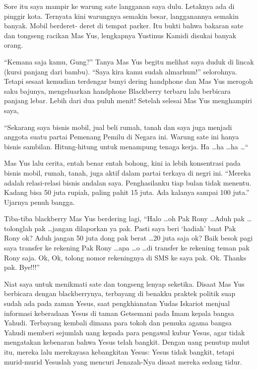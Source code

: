 
\small
	Sore itu saya mampir ke warung sate langganan saya dulu. Letaknya ada di pinggir kota. Ternyata kini warungnya semakin besar, langganannya semakin banyak. Mobil berderet- deret di tempat parker. Itu bukti bahwa bakaran sate dan tongseng racikan Mas Yus, lengkapnya Yustinus Kamidi disukai banyak orang.
	
	``Kemana saja kamu, Gung?'' Tanya Mas Yus begitu melihat saya duduk di lincak (kursi panjang dari bambu). ``Saya kira kamu sudah almarhum!'' selorohnya. Tetapi sesaat kemudian terdengar bunyi dering handphone dan Mas Yus  merogoh saku bajunya, mengeluarkan handphone Blackberry terbaru lalu berbicara panjang lebar. Lebih dari dua puluh menit! Setelah selesai Mas Yus menghampiri saya, 
	
	``Sekarang saya bisnis mobil, jual beli rumah, tanah dan saya juga menjadi anggota suatu partai Pemenang Pemilu di Negara ini. Warung sate ini hanya bisnis sambilan. Hitung-hitung untuk menampung tenaga kerja. Ha \ldots ha \ldots ha \ldots  ``

	Mas Yus lalu cerita, entah benar entah bohong, kini ia lebih konsentrasi pada bisnis mobil, rumah, tanah, juga aktif dalam partai terkaya di negri ini. ``Mereka adalah relasi-relasi bisnis andalan saya. Penghasilanku tiap bulan tidak menentu. Kadang bisa 50 juta rupiah, paling pahit 15 juta. Ada kalanya sampai 100 juta.'' Ujarnya penuh bangga.   
	
	Tiba-tiba blackberry Mas Yus berdering lagi, ``Halo \ldots  oh Pak Rony \ldots  Aduh pak \ldots  tolonglah pak \ldots  jangan dilaporkan ya pak. Pasti saya beri `hadiah' buat Pak Rony ok?  Aduh jangan 50 juta dong pak berat \ldots  20 juta saja ok? Baik besok pagi saya transfer ke rekening Pak Rony \ldots  apa \ldots  o \ldots  di transfer ke rekening teman pak Rony saja. Ok, Ok, tolong nomor rekeningnya di SMS ke saya pak. Ok. Thanks pak. Bye!!!''

	Niat saya untuk menikmati sate dan tongseng lenyap seketika. Disaat Mas Yus berbicara dengan blackberrynya, terbayang di benakku praktek politik suap sudah ada pada zaman Yesus, saat pengkhianatan Yudas Iskariot menjual informasi keberadaan Yesus di taman Getsemani pada Imam kepala bangsa Yahudi. Terbayang kembali dimana para tokoh dan pemuka agama bangsa Yahudi memberi sejumlah uang kepada para pengawal kubur Yesus, agar tidak mengatakan kebenaran bahwa Yesus telah bangkit. Dengan uang penutup mulut itu, mereka lalu merekayasa kebangkitan Yesus: Yesus tidak bangkit, tetapi murid-murid Yesuslah yang mencuri Jenazah-Nya disaat mereka sedang tidur.

